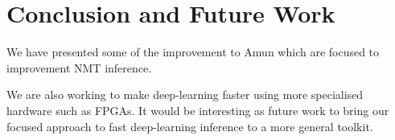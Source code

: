 \documentclass[11pt,a4paper]{article}
\begin{document}
\section{Conclusion and Future Work}

We have presented some of the improvement to Amun which are focused to improvement NMT inference.

We are also working to make deep-learning faster using more specialised hardware such as FPGAs. It would be interesting as future work to bring our focused approach to fast deep-learning inference to a more general toolkit. 




\end{document}
